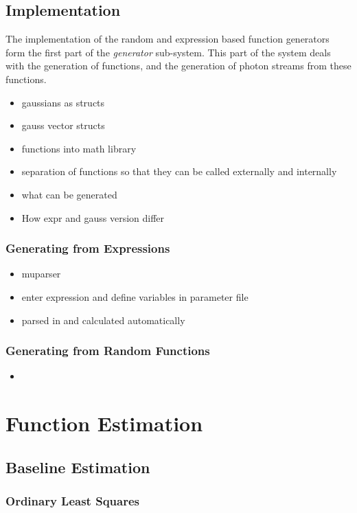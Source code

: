 \documentclass[a4paper,11pt]{article}
\begin{document}
\subsection{Implementation}
\label{sec-3-3}

    The implementation of the random and expression based function generators
    form the first part of the \emph{generator} sub-system. This part of the
    system deals with the generation of functions, and the generation of photon
    streams from these functions.
\begin{itemize}
\item gaussians as structs
\item gauss vector structs
\item functions into math library
\item separation of functions so that they can be called externally and internally
\item what can be generated
\item How expr and gauss version differ
\end{itemize}
\subsubsection{Generating from Expressions}
\label{sec-3-3-1}

\begin{itemize}
\item muparser
\item enter expression and define variables in parameter file
\item parsed in and calculated automatically
\end{itemize}
\subsubsection{Generating from Random Functions}
\label{sec-3-3-2}

\begin{itemize}
\item 
\end{itemize}
\section{Function Estimation}
\label{sec-4}
\subsection{Baseline Estimation}
\label{sec-4-1}
\subsubsection{Ordinary Least Squares}
\label{sec-4-1-1}
\end{document}
